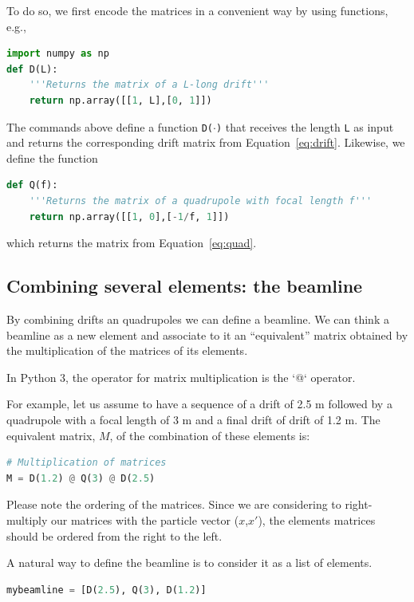 \documentclass{article}
\newenvironment{block}[1]{\tcolorbox[beamer,%
    noparskip,breakable,
    colback=backcolour,colframe=blue,%
    colbacklower=backcolour!75!backcolour,%
    title=#1]
    }%
    {\endtcolorbox}
\begin{document}
To do so, we first encode the matrices in a convenient way by using functions, e.g.,
\begin{lstlisting}[language=Python]
import numpy as np
def D(L):
    '''Returns the matrix of a L-long drift'''
    return np.array([[1, L],[0, 1]])
\end{lstlisting}
The commands above define a function {\tt D($\cdot$)} that receives the length {\tt L} as input and 
returns the corresponding drift matrix from Equation~\ref{eq:drift}.
Likewise, we define the function
\begin{lstlisting}[language=Python]
def Q(f):
    '''Returns the matrix of a quadrupole with focal length f'''
    return np.array([[1, 0],[-1/f, 1]])
\end{lstlisting}
which returns the matrix from Equation~\ref{eq:quad}.

\subsection{Combining several elements: the beamline}

By combining drifts an quadrupoles we can define a beamline. We can think a beamline as a new element and associate to it an ``equivalent'' matrix obtained by the multiplication of the matrices of its elements.
\vspace{3mm} 
\begin{block}{Nota Bene}
In Python 3, the operator for matrix multiplication is the `@` operator.
\end{block}

For example, let us assume to have a sequence of a drift of 2.5 m followed by a quadrupole with a focal length of 3 m and a final drift of drift of 1.2 m. The equivalent matrix, $M$, of the combination of these elements is: 
\begin{lstlisting}[language=Python]
# Multiplication of matrices
M = D(1.2) @ Q(3) @ D(2.5)
\end{lstlisting}

\begin{block}{Nota Bene}
Please note the ordering of the matrices. Since we are considering to right-multiply our matrices with the particle vector ($x$,$x'$), the elements matrices should be ordered from the right to the left.
\end{block}

A natural way to define the beamline is to consider it as a list of elements.
\begin{lstlisting}[language=Python]
mybeamline = [D(2.5), Q(3), D(1.2)]
\end{lstlisting}
\end{document}
